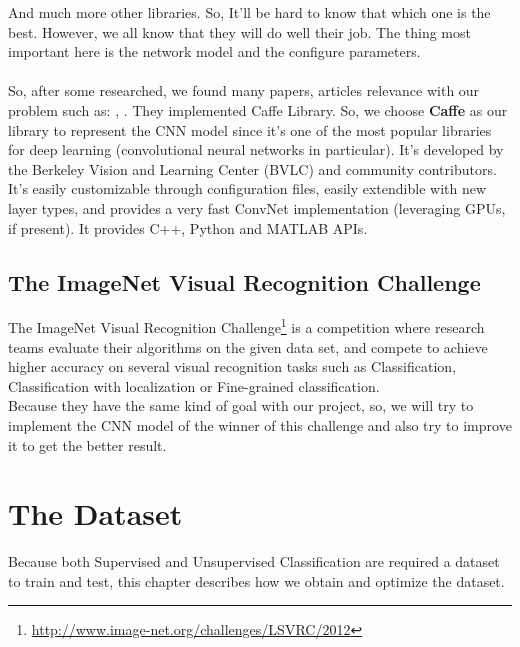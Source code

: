 \documentclass[hidelinks,12pt,a4paper]{report}
\begin{document}
And much more other libraries. So, It’ll be hard to know that which one is the best. However, we all know that they will do well their job. The thing most important here is the network model and the configure parameters. \\
\\
So, after some researched, we found many papers, articles relevance with our problem such as: \cite{placesdatabase}, \cite{landclassification}. They implemented Caffe Library. So, we choose \textbf{Caffe} as our library to represent the CNN model since it’s one of the most popular libraries for deep learning (convolutional neural networks in particular). It's developed by the Berkeley Vision and Learning Center (BVLC) and
community contributors. It’s easily customizable through configuration files, easily extendible with new layer types,
and provides a very fast ConvNet implementation (leveraging GPUs, if present). It provides C++, Python and MATLAB APIs.

\newpage

\section{The ImageNet Visual Recognition Challenge}

The ImageNet Visual Recognition Challenge\footnote{\url{http://www.image-net.org/challenges/LSVRC/2012}} is a competition where research teams evaluate their algorithms on the given data set, and compete to achieve higher accuracy on several visual recognition tasks such as Classification, Classification with localization or Fine-grained classification. \\
Because they have the same kind of goal with our project, so, we will try to implement the CNN model of the winner of this challenge and also try to improve it to get the better result.

\chapter{The Dataset}
Because both Supervised and Unsupervised Classification are required a dataset to train and test, this chapter describes how we obtain and optimize the dataset.
\end{document}

